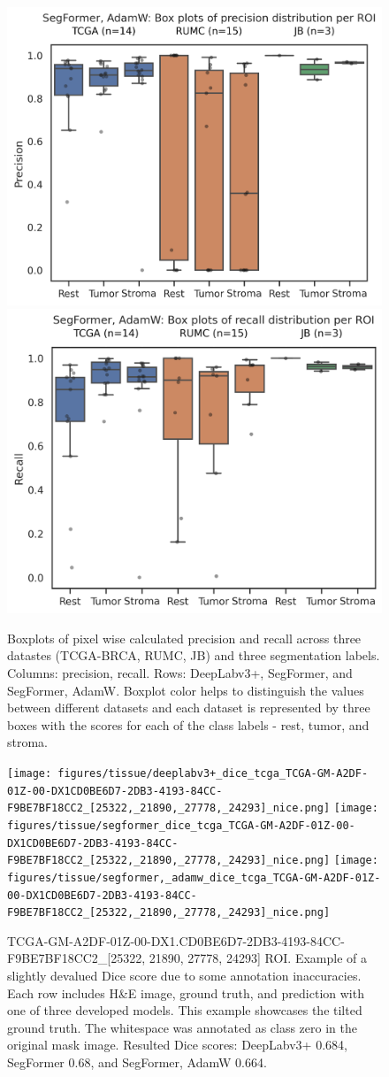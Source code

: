 \begin{figure}[H]
\includegraphics[width=.5\linewidth]{figures/tissue/segformer,_adamw_prec_roi_wsirois.png}
\includegraphics[width=.5\linewidth]{figures/tissue/segformer,_adamw_recall_roi_wsirois.png}
\caption{Boxplots of pixel wise calculated precision and recall across three datastes (TCGA-BRCA, RUMC, JB) and three segmentation labels.
Columns: precision, recall. Rows: DeepLabv3+, SegFormer, and SegFormer, AdamW. 
Boxplot color helps to distinguish the values between different datasets and each dataset is
represented by three boxes with the scores for each of the class labels - rest, tumor, and stroma. }
\label{fig:tissue_pr_r_boxplots}
\end{figure}

\begin{figure}[H]
    \texttt{[image: figures/tissue/deeplabv3+\_dice\_tcga\_TCGA-GM-A2DF-01Z-00-DX1CD0BE6D7-2DB3-4193-84CC-F9BE7BF18CC2\_[25322,\_21890,\_27778,\_24293]\_nice.png]}
    \texttt{[image: figures/tissue/segformer\_dice\_tcga\_TCGA-GM-A2DF-01Z-00-DX1CD0BE6D7-2DB3-4193-84CC-F9BE7BF18CC2\_[25322,\_21890,\_27778,\_24293]\_nice.png]}
    \texttt{[image: figures/tissue/segformer,\_adamw\_dice\_tcga\_TCGA-GM-A2DF-01Z-00-DX1CD0BE6D7-2DB3-4193-84CC-F9BE7BF18CC2\_[25322,\_21890,\_27778,\_24293]\_nice.png]}
    
    \caption{TCGA-GM-A2DF-01Z-00-DX1.CD0BE6D7-2DB3-4193-84CC-F9BE7BF18CC2\_[25322, 21890, 27778, 24293] ROI.
    Example of a slightly devalued Dice score due to some annotation inaccuracies. 
    Each row includes H\&E image, ground truth, and prediction with one of three developed models. This example showcases the tilted ground truth. The whitespace was annotated as class zero in the original mask image.
    Resulted Dice scores: DeepLabv3+ 0.684, SegFormer 0.68, and SegFormer, AdamW 0.664.}
    \label{fig:TCGA-GM-A2DF}
\end{figure}
    

